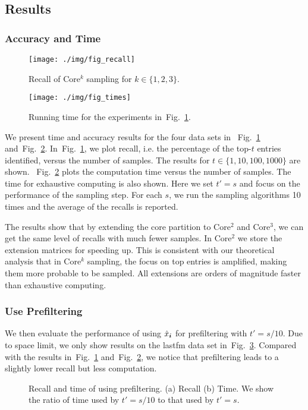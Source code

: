 \documentclass[10pt,journal,compsoc]{IEEEtran}
\newcommand{\V}[1]{{\boldsymbol{{\MakeLowercase{#1}}}}}
\newcommand{\predx}{\hat{x}_{\V{i}}}
\newcommand{\Fig}[1]{Fig.~\ref{fig:#1}}
\begin{document}
\subsection{Results}
\subsubsection{Accuracy and Time}

\begin{figure}[!]
	\centering
	\texttt{[image: ./img/fig\_recall]}\\
	\caption{Recall of Core$^k$ sampling for $k\in\{1,2,3\}$.}
	\label{fig:recall}
\end{figure}
\begin{figure}[!]
	\centering
	\texttt{[image: ./img/fig\_times]}\\
	\caption{Running time for the experiments in~\Fig{recall}.}
	\label{fig:time}
\end{figure}
We present time and accuracy results for the four data sets in
~\Fig{recall} and~\Fig{time}.
In~\Fig{recall}, we plot recall, i.e. the percentage of the top-$t$ entries identified,
versus the number of samples.
The results for $t\in\{1,10,100,1000\}$ are shown.
~\Fig{time} plots the computation time versus the number of samples.
The time for exhaustive computing is also shown.
Here we set $t'=s$ and focus on the performance of the sampling step.
For each $s$, we run the sampling algorithms 10 times and the average of the recalls is reported.

The results show that by extending the core partition to Core$^2$ and Core$^3$,
we can get the same level of recalls with much fewer samples.
In Core$^2$ we store the extension matrices for speeding up.
This is consistent with our theoretical analysis that in Core$^k$ sampling,
the focus on top entries is amplified,
making them more probable to be sampled.
All extensions are orders of magnitude faster than exhaustive computing.

\subsubsection{Use Prefiltering}
We then evaluate the performance of using $\predx$ for prefiltering with $t'=s/10$.
Due to space limit, we only show results on the lastfm data set in~\Fig{lastfm_budget}.
Compared with the results in~\Fig{recall} and~\Fig{time},
we notice that prefiltering leads to a slightly lower recall but less computation.
\begin{figure}[H]
	\centering
	\caption{Recall and time of using prefiltering.
		(a) Recall (b) Time.
		We show the ratio of time used by $t'=s/10$ to that used by $t'=s$.}
	\label{fig:lastfm_budget}
\end{figure}
\end{document}
